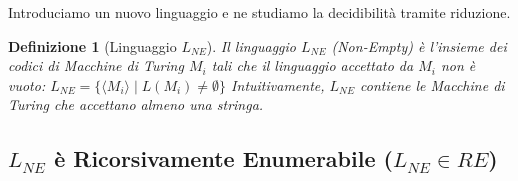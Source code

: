 \documentclass[a4paper]{article}
\newtheorem{definition}[theorem]{Definizione}
\begin{document}
Introduciamo un nuovo linguaggio e ne studiamo la decidibilità tramite riduzione.

\begin{definition}[Linguaggio $L_{NE}$]
Il linguaggio $L_{NE}$ (Non-Empty) è l'insieme dei codici di Macchine di Turing $M_i$ tali che il linguaggio accettato da $M_i$ non è vuoto:
$L_{NE} = \{ \langle M_i \rangle \mid L(M_i) \neq \emptyset \}$
Intuitivamente, $L_{NE}$ contiene le Macchine di Turing che accettano almeno una stringa.
\end{definition}

\subsection{$L_{NE}$ è Ricorsivamente Enumerabile ($L_{NE} \in RE$)}
\end{document}
